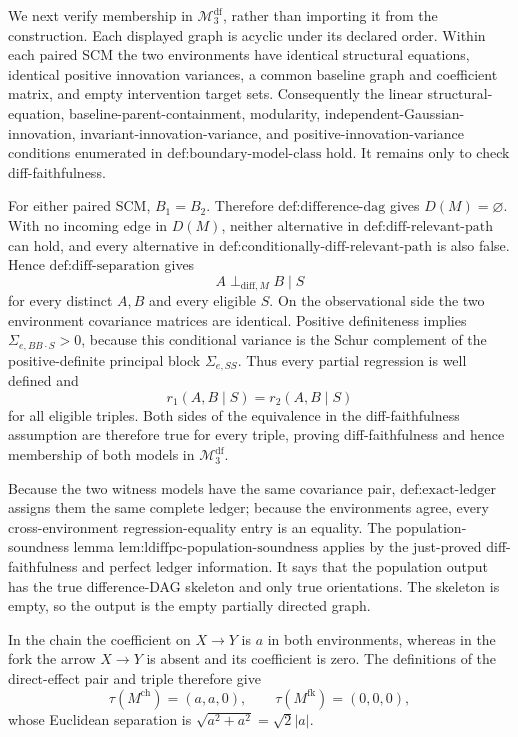 We next verify membership in \(\mathcal M_3^{\mathrm{df}}\), rather than importing it from the construction.  Each displayed graph is acyclic under its declared order.  Within each paired SCM the two environments have identical structural equations, identical positive innovation variances, a common baseline graph and coefficient matrix, and empty intervention target sets.  Consequently the linear structural-equation, baseline-parent-containment, modularity, independent-Gaussian-innovation, invariant-innovation-variance, and positive-innovation-variance conditions enumerated in \(\text{def:boundary-model-class}\) hold.  It remains only to check diff-faithfulness.

For either paired SCM, \(B_1=B_2\).  Therefore \(\text{def:difference-dag}\) gives \(D(M)=\varnothing\).  With no incoming edge in \(D(M)\), neither alternative in \(\text{def:diff-relevant-path}\) can hold, and every alternative in \(\text{def:conditionally-diff-relevant-path}\) is also false.  Hence \(\text{def:diff-separation}\) gives
\[
 A\perp_{\mathrm{diff},M}B\mid S
\]
for every distinct \(A,B\) and every eligible \(S\).  On the observational side the two environment covariance matrices are identical.  Positive definiteness implies \(\Sigma_{e,BB\cdot S}>0\), because this conditional variance is the Schur complement of the positive-definite principal block \(\Sigma_{e,SS}\).  Thus every partial regression is well defined and
\[
 r_1(A,B\mid S)=r_2(A,B\mid S)
\]
for all eligible triples.  Both sides of the equivalence in the diff-faithfulness assumption are therefore true for every triple, proving diff-faithfulness and hence membership of both models in \(\mathcal M_3^{\mathrm{df}}\).

Because the two witness models have the same covariance pair, \(\text{def:exact-ledger}\) assigns them the same complete ledger; because the environments agree, every cross-environment regression-equality entry is an equality.  The population-soundness lemma \(\text{lem:ldiffpc-population-soundness}\) applies by the just-proved diff-faithfulness and perfect ledger information.  It says that the population output has the true difference-DAG skeleton and only true orientations.  The skeleton is empty, so the output is the empty partially directed graph.

In the chain the coefficient on \(X\to Y\) is \(a\) in both environments, whereas in the fork the arrow \(X\to Y\) is absent and its coefficient is zero.  The definitions of the direct-effect pair and triple therefore give
\[
 \tau(M^{\mathrm{ch}})=(a,a,0),\qquad
 \tau(M^{\mathrm{fk}})=(0,0,0),
\]
whose Euclidean separation is \(\sqrt{a^2+a^2}=\sqrt2|a|\).

